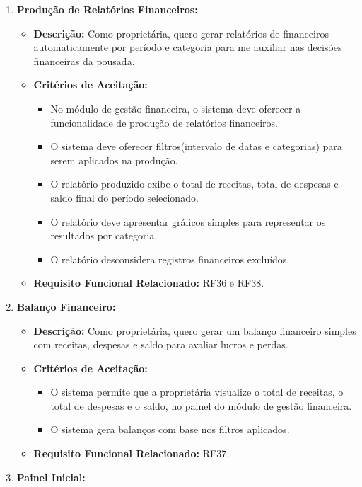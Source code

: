 \documentclass[
	12pt,				%
	openany,			%
	twoside,			%
	a4paper,			%
	english,			%
	french,				%
	spanish,			%
	brazil				%
	]{abntex2}
\begin{document}
\begin{enumerate}[label=\textbf{\arabic*.}]
\begin{itemize}
	 \end{itemize} 
	  \item \textbf{Produção de Relatórios Financeiros:}
	 \begin{itemize}
	 	\item \textbf{Descrição:} Como proprietária, quero gerar relatórios de financeiros automaticamente por período e categoria para me auxiliar nas decisões financeiras da pousada.
	 	\item \textbf{Critérios de Aceitação:}
	 	\begin{itemize}
	 		\item No módulo de gestão financeira, o sistema deve oferecer a funcionalidade de produção de relatórios financeiros.
	 		\item O sistema deve oferecer filtros(intervalo de datas e categorias) para serem aplicados na produção.
	 		\item O relatório produzido exibe o total de receitas, total de despesas e saldo final do período selecionado.
	 		\item O relatório deve apresentar gráficos simples para representar os resultados por categoria.
	 		\item O relatório desconsidera registros financeiros excluídos.
	 	\end{itemize}
	 	\item \textbf{Requisito Funcional Relacionado:} RF36 e RF38.
	 \end{itemize} 
	  \item \textbf{Balanço Financeiro:}
	 \begin{itemize}
	 	\item \textbf{Descrição:} Como proprietária, quero gerar um balanço financeiro simples com receitas, despesas e saldo para avaliar lucros e perdas.
	 	\item \textbf{Critérios de Aceitação:}
	 	\begin{itemize}
	 		\item O sistema permite que a proprietária visualize o total de receitas, o total de despesas e o saldo, no painel do módulo de gestão financeira.
	 		\item O sistema gera balanços com base nos filtros aplicados.
	 	\end{itemize}
	 	\item \textbf{Requisito Funcional Relacionado:} RF37.
	 \end{itemize} 
	  \item \textbf{Painel Inicial:}
	 \begin{itemize}

\end{itemize}
\end{enumerate}
\end{document}
